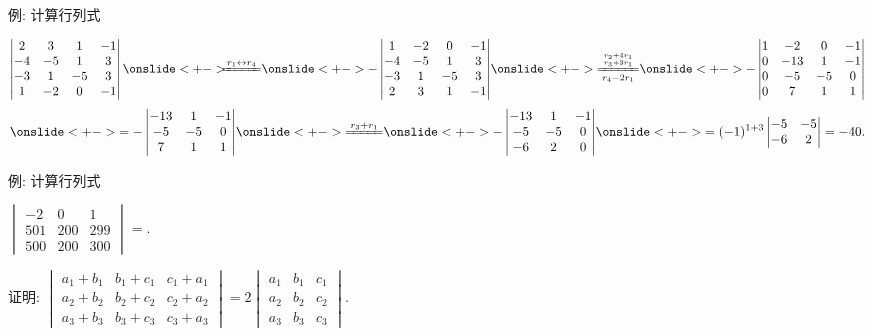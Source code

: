 \begin{frame}{例: 计算行列式}
	\onslide<+->
	\begin{example}
		\[\begin{vmatrix}
			 2& 3& 1&-1\\
			-4&-5& 1& 3\\
			-3& 1&-5& 3\\
			 1&-2& 0&-1
		\end{vmatrix}
		\onslide<+->{\hspace{-2mm}\xeq{r_1\swap r_4}}
		\onslide<+->{-\begin{vmatrix}
			1&-2& 0&-1\\
		 -4&-5& 1& 3\\
		 -3& 1&-5& 3\\
		  2& 3& 1&-1
		\end{vmatrix}}
		\onslide<+->{\xeq[r_4-2r_1]{r_2+4r_1\atop r_3+3r_1}}
		\onslide<+->{-\begin{vmatrix}
			1&-2& 0&-1\\
		  0&-13& 1&-1\\
		  0&-5&-5&0\\
		  0& 7& 1&1
		\end{vmatrix}}\]
		\[\onslide<+->{=-\begin{vmatrix}
			-13& 1&-1\\
			-5&-5&0\\
				7& 1&1
			\end{vmatrix}}
		\onslide<+->{\xeq{r_3+r_1}}
		\onslide<+->{-\begin{vmatrix}
			-13& 1&-1\\
			-5&-5&0\\
			-6& 2&0
		\end{vmatrix}}
		\onslide<+->{=(-1)^{1+3}\begin{vmatrix}
			-5&-5\\-6&2
		\end{vmatrix}=-40.}\]
	\end{example}
\end{frame}


\begin{frame}{例: 计算行列式}
	\onslide<+->
	\begin{exercise}
		$\begin{vmatrix}
			-2&0&1\\
			501&200&299\\
			500&200&300
		\end{vmatrix}=$.
	\end{exercise}
	\onslide<+->
	\begin{example}
		证明:
		$\begin{vmatrix}
			a_1+b_1&b_1+c_1&c_1+a_1\\
			a_2+b_2&b_2+c_2&c_2+a_2\\
			a_3+b_3&b_3+c_3&c_3+a_3
		\end{vmatrix}=2\begin{vmatrix}
			a_1&b_1&c_1\\
			a_2&b_2&c_2\\
			a_3&b_3&c_3
		\end{vmatrix}$.
	\end{example}
\end{frame}


